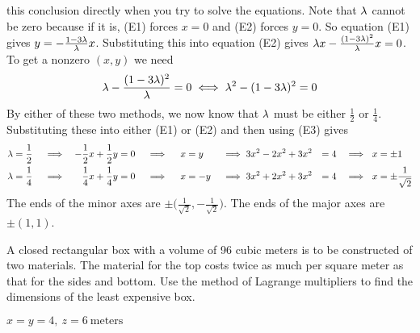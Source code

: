 \begin{solution}
this conclusion directly when you try to solve the equations. Note that
$\lambda$ cannot be zero because if it is, (E1) forces $x=0$ and (E2) forces
$y=0$. So equation (E1) gives $y=-\frac{1-3\lambda}{\lambda}x$. Substituting this into
equation (E2) gives $\lambda x-\frac{(1-3\lambda)^2}{\lambda}x=0$. To get a nonzero
$(x,y)$ we need 
\begin{equation*}
\lambda -\frac{(1-3\lambda)^2}{\lambda}=0\iff \lambda^2-(1-3\lambda)^2=0
\end{equation*}
By either of these two methods, we now know that $\lambda$ must be either
$\frac{1}{2}$ or $\frac{1}{4}$. Substituting these into either (E1) or 
(E2) and then using (E3) gives
\begin{alignat*}{9}
\lambda&=\frac{1}{2}&&\implies& -\frac{1}{2} x+\frac{1}{2} y&=0 
                &&\implies\ & x&=y
                &&\implies 3x^2-2x^2+3x^2&=4
                &&\implies\ x&=\pm 1\\
\lambda&=\frac{1}{4}&&\implies& \frac{1}{4} x+\frac{1}{4} y&=0 
                &&\implies\ & x&=-y
                &&\implies 3x^2+2x^2+3x^2&=4
                &&\implies\ x&=\pm \frac{1}{\sqrt{2}}
\end{alignat*}
The ends of the minor axes are $\pm\big(\frac{1}{\sqrt{2}},-\frac{1}{\sqrt{2}}\big)$.
The ends of the major axes are $\pm(1,1)$.
\end{solution}

\begin{question}[M200 2003D] %
A closed rectangular box with a volume of 96 cubic meters
is to be constructed of two materials. The material for the top costs twice
as much per square meter as that for the sides and bottom. Use the method 
of Lagrange multipliers to find the dimensions of the least expensive box.
\end{question}

%

\begin{answer}
$x=y=4,\ z=6\ \text{meters}$
\end{answer}

